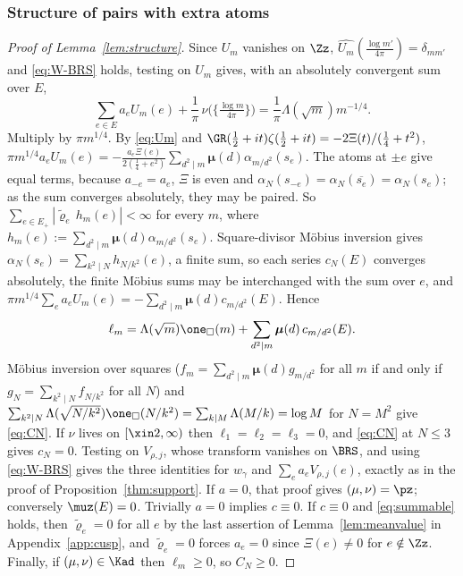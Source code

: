 \subsubsection{Structure of pairs with extra atoms}\label{app:proofs-structure}
\begin{proof}[Proof of Lemma~\textup{\ref{lem:structure}}]
Since $U_m$ vanishes on $\Zz$, $\widehat{U_m}(\frac{\log m'}{4\pi})=\delta_{mm'}$ and \eqref{eq:W-BRS} holds, testing on $U_m$ gives, with an
absolutely convergent sum over $E$,
\[
\sum_{e\in E}a_eU_m(e)+\frac1\pi\,\nu\big(\{\tfrac{\log m}{4\pi}\}\big)=\frac1\pi\Lambda(\sqrt m)m^{-1/4}.
\]
Multiply by $\pi m^{1/4}$. By \eqref{eq:Um} and $\GR(\frac12+it)\zeta(\frac12+it)=-2\Xi(t)/(\frac14+t^2)$,
$\pi m^{1/4}a_eU_m(e)=-\frac{a_e\Xi(e)}{2(\frac14+e^2)}\sum_{d^2\mid m}\boldsymbol\mu(d)\alpha_{m/d^2}(s_e)$. The atoms at $\pm e$ give equal
terms, because $a_{-e}=a_e$, $\Xi$ is even and $\alpha_N(s_{-e})=\alpha_N(\overline{s_e})=\alpha_N(s_e)$; as the sum converges absolutely, they
may be paired. So $\sum_{e\in E_+}|\tilde\varrho_e\,h_m(e)|<\infty$ for every $m$, where $h_m(e):=\sum_{d^2\mid m}\boldsymbol\mu(d)\alpha_{m/d^2}(s_e)$.
Square-divisor M\"obius inversion gives $\alpha_N(s_e)=\sum_{k^2\mid N}h_{N/k^2}(e)$, a finite sum, so each series $c_N(E)$ converges absolutely,
the finite M\"obius sums may be interchanged with the sum over $e$, and $\pi m^{1/4}\sum_ea_eU_m(e)=-\sum_{d^2\mid m}\boldsymbol\mu(d)c_{m/d^2}(E)$.
Hence
\[
\ell_m=\Lambda(\sqrt m)\one_\square(m)+\sum_{d^2\mid m}\boldsymbol\mu(d)\,c_{m/d^2}(E).
\]
M\"obius inversion over squares ($f_m=\sum_{d^2\mid m}\boldsymbol\mu(d)g_{m/d^2}$ for all $m$ if and only if
$g_N=\sum_{k^2\mid N}f_{N/k^2}$ for all $N$) and $\sum_{k^2\mid N}\Lambda(\sqrt{N/k^2})\one_\square(N/k^2)=\sum_{k\mid M}\Lambda(M/k)=\log M$ for
$N=M^2$ give \eqref{eq:CN}. If $\nu$ lives on $[\xin2,\infty)$ then $\ell_1=\ell_2=\ell_3=0$, and
\eqref{eq:CN} at $N\le3$ gives $c_N=0$. Testing on $V_{\rho,j}$, whose transform vanishes on $\BRS$, and using \eqref{eq:W-BRS}
gives the three identities for $w_\gamma$ and $\sum_ea_eV_{\rho,j}(e)$, exactly as in the proof of Proposition~\ref{thm:support}. If
$a=0$, that proof gives $(\mu,\nu)=\pz$; conversely $\muz(E)=0$. Trivially $a=0$ implies $c\equiv0$. If $c\equiv0$ and \eqref{eq:summable}
holds, then $\tilde\varrho_e=0$ for all $e$ by the last assertion of Lemma~\ref{lem:meanvalue} in Appendix~\ref{app:cusp}, and
$\tilde\varrho_e=0$ forces $a_e=0$ since $\Xi(e)\ne0$ for $e\notin\Zz$. Finally, if $(\mu,\nu)\in\Kad$ then $\ell_m\ge0$, so $C_N\ge0$.
\end{proof}

